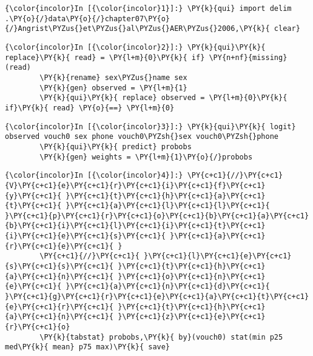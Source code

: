 \documentclass[11pt,notitlepage]{article}\usepackage[]{graphicx}\usepackage[]{color}
\makeatletter
\newenvironment{kframe}{%
 \def\at@end@of@kframe{}%
 \ifinner\ifhmode%
  \def\at@end@of@kframe{\end{minipage}}%
  \begin{minipage}{\columnwidth}%
 \fi\fi%
 \def\FrameCommand##1{\hskip\@totalleftmargin \hskip-\fboxsep
 \colorbox{shadecolor}{##1}\hskip-\fboxsep
     \hskip-\linewidth \hskip-\@totalleftmargin \hskip\columnwidth}%
 \MakeFramed {\advance\hsize-\width
   \@totalleftmargin\z@ \linewidth\hsize
   \@setminipage}}%
 {\par\unskip\endMakeFramed%
 \at@end@of@kframe}
\newenvironment{knitrout}{}{} %
\makeatother
\begin{document}
\begin{knitrout}
\color{fgcolor}\begin{kframe}
    \begin{Verbatim}[commandchars=\\\{\}]
{\color{incolor}In [{\color{incolor}1}]:} \PY{k}{qui} import delim .\PY{o}{/}data\PY{o}{/}chapter07\PY{o}{/}Angrist\PYZus{}et\PYZus{}al\PYZus{}AER\PYZus{}2006,\PY{k}{ clear}
\end{Verbatim}

    \begin{Verbatim}[commandchars=\\\{\}]
{\color{incolor}In [{\color{incolor}2}]:} \PY{k}{qui}\PY{k}{ replace}\PY{k}{ read} = \PY{l+m}{0}\PY{k}{ if} \PY{n+nf}{missing}(read)
        \PY{k}{rename} sex\PYZus{}name sex
        \PY{k}{gen} observed = \PY{l+m}{1}
        \PY{k}{qui}\PY{k}{ replace} observed = \PY{l+m}{0}\PY{k}{ if}\PY{k}{ read} \PY{o}{==} \PY{l+m}{0}
\end{Verbatim}

    \begin{Verbatim}[commandchars=\\\{\}]
{\color{incolor}In [{\color{incolor}3}]:} \PY{k}{qui}\PY{k}{ logit} observed vouch0 sex phone vouch0\PYZsh{}sex vouch0\PYZsh{}phone
        \PY{k}{qui}\PY{k}{ predict} probobs
        \PY{k}{gen} weights = \PY{l+m}{1}\PY{o}{/}probobs
\end{Verbatim}


    \begin{Verbatim}[commandchars=\\\{\}]
{\color{incolor}In [{\color{incolor}4}]:} \PY{c+c1}{//}\PY{c+c1}{V}\PY{c+c1}{e}\PY{c+c1}{r}\PY{c+c1}{i}\PY{c+c1}{f}\PY{c+c1}{y}\PY{c+c1}{ }\PY{c+c1}{t}\PY{c+c1}{h}\PY{c+c1}{a}\PY{c+c1}{t}\PY{c+c1}{ }\PY{c+c1}{a}\PY{c+c1}{l}\PY{c+c1}{l}\PY{c+c1}{ }\PY{c+c1}{p}\PY{c+c1}{r}\PY{c+c1}{o}\PY{c+c1}{b}\PY{c+c1}{a}\PY{c+c1}{b}\PY{c+c1}{i}\PY{c+c1}{l}\PY{c+c1}{i}\PY{c+c1}{t}\PY{c+c1}{i}\PY{c+c1}{e}\PY{c+c1}{s}\PY{c+c1}{ }\PY{c+c1}{a}\PY{c+c1}{r}\PY{c+c1}{e}\PY{c+c1}{ }
        \PY{c+c1}{//}\PY{c+c1}{ }\PY{c+c1}{l}\PY{c+c1}{e}\PY{c+c1}{s}\PY{c+c1}{s}\PY{c+c1}{ }\PY{c+c1}{t}\PY{c+c1}{h}\PY{c+c1}{a}\PY{c+c1}{n}\PY{c+c1}{ }\PY{c+c1}{o}\PY{c+c1}{n}\PY{c+c1}{e}\PY{c+c1}{ }\PY{c+c1}{a}\PY{c+c1}{n}\PY{c+c1}{d}\PY{c+c1}{ }\PY{c+c1}{g}\PY{c+c1}{r}\PY{c+c1}{e}\PY{c+c1}{a}\PY{c+c1}{t}\PY{c+c1}{e}\PY{c+c1}{r}\PY{c+c1}{ }\PY{c+c1}{t}\PY{c+c1}{h}\PY{c+c1}{a}\PY{c+c1}{n}\PY{c+c1}{ }\PY{c+c1}{z}\PY{c+c1}{e}\PY{c+c1}{r}\PY{c+c1}{o}
        \PY{k}{tabstat} probobs,\PY{k}{ by}(vouch0) stat(min p25 med\PY{k}{ mean} p75 max)\PY{k}{ save}
\end{Verbatim}


\end{kframe}
\end{knitrout}
\end{document}

